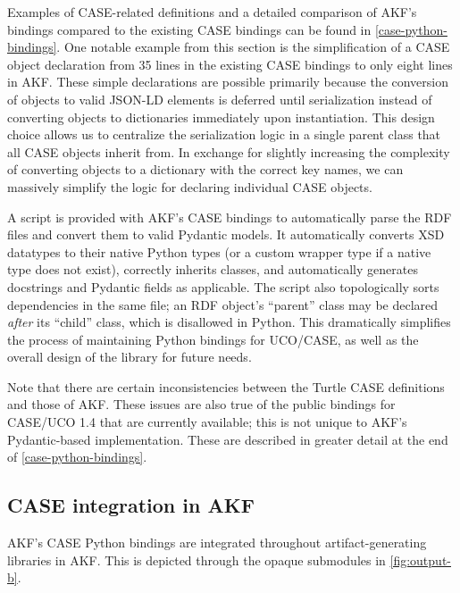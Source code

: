 \documentclass[letterpaper,12pt]{report}
\begin{document}
Examples of CASE-related definitions and a detailed comparison of AKF's
bindings compared to the existing CASE bindings can be found in
\autoref{case-python-bindings}. One notable example
from this section is the simplification of a CASE object declaration
from 35 lines in the existing CASE bindings to only eight lines in AKF.
These simple declarations are possible primarily because the conversion
of objects to valid JSON-LD elements is deferred until serialization
instead of converting objects to dictionaries immediately upon
instantiation. This design choice allows us to centralize the
serialization logic in a single parent class that all CASE objects
inherit from. In exchange for slightly increasing the complexity of
converting objects to a dictionary with the correct key names, we can
massively simplify the logic for declaring individual CASE objects.

A script is provided with AKF's CASE bindings to automatically parse the
RDF files and convert them to valid Pydantic models. It automatically
converts XSD datatypes to their native Python types (or a custom wrapper
type if a native type does not exist), correctly inherits classes, and
automatically generates docstrings and Pydantic fields as applicable.
The script also topologically sorts dependencies in the same file; an
RDF object's ``parent'' class may be declared \emph{after} its ``child''
class, which is disallowed in Python. This dramatically simplifies the
process of maintaining Python bindings for UCO/CASE, as well as the
overall design of the library for future needs.

Note that there are certain inconsistencies between the Turtle CASE
definitions and those of AKF. These issues are also true of the public
bindings for CASE/UCO 1.4 that are currently available; this is not
unique to AKF's Pydantic-based implementation. These are described in
greater detail at the end of \autoref{case-python-bindings}.

\subsection{CASE integration in
AKF}\label{case-integration-in-akf}

AKF's CASE Python bindings are integrated throughout artifact-generating
libraries in AKF. This is depicted through the opaque submodules in
\autoref{fig:output-b}.
\end{document}
